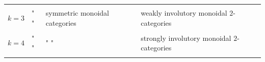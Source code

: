\documentclass[12pt]{article}
\begin{document}
\begin{longtable}[]{@{}llll@{}}
\begin{minipage}[t]{0.21\columnwidth}
\strut
\end{minipage}\tabularnewline
\begin{minipage}[t]{0.26\columnwidth}\raggedright
\(k=3\)\strut
\end{minipage} & \begin{minipage}[t]{0.21\columnwidth}\raggedright
" "\strut
\end{minipage} & \begin{minipage}[t]{0.21\columnwidth}\raggedright
symmetric monoidal categories\strut
\end{minipage} & \begin{minipage}[t]{0.21\columnwidth}\raggedright
weakly involutory monoidal \(2\)-categories\strut
\end{minipage}\tabularnewline
\begin{minipage}[t]{0.26\columnwidth}\raggedright
\strut
\end{minipage} & \begin{minipage}[t]{0.21\columnwidth}\raggedright
\strut
\end{minipage} & \begin{minipage}[t]{0.21\columnwidth}\raggedright
\strut
\end{minipage} & \begin{minipage}[t]{0.21\columnwidth}\raggedright
\strut
\end{minipage}\tabularnewline
\begin{minipage}[t]{0.26\columnwidth}\raggedright
\(k=4\)\strut
\end{minipage} & \begin{minipage}[t]{0.21\columnwidth}\raggedright
" "\strut
\end{minipage} & \begin{minipage}[t]{0.21\columnwidth}\raggedright
" "\strut
\end{minipage} & \begin{minipage}[t]{0.21\columnwidth}\raggedright
strongly involutory monoidal \(2\)-categories\strut
\end{minipage}\tabularnewline
\begin{minipage}[t]{0.26\columnwidth}\raggedright
\strut
\end{minipage} & \begin{minipage}[t]{0.21\columnwidth}\raggedright
\strut
\end{minipage} & \begin{minipage}[t]{0.21\columnwidth}\raggedright
\strut
\end{minipage} & \begin{minipage}[t]{0.21\columnwidth}\raggedright

\end{minipage}
\end{longtable}
\end{document}
